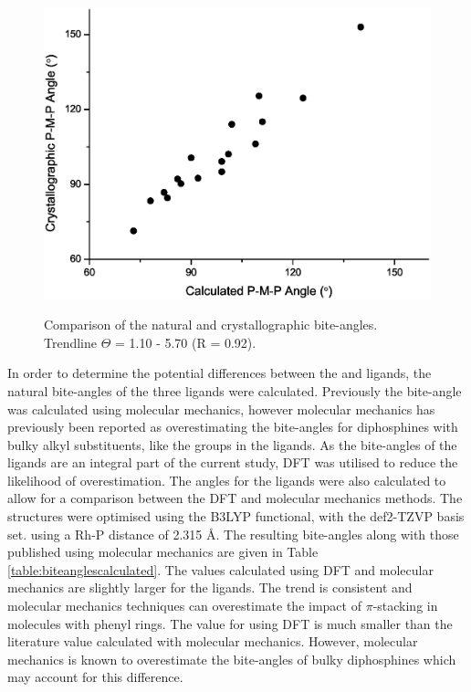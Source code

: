 \begin{figure}[htb]
\begin{center}
\vspace{0.5cm}
\includegraphics[width=\textwidth]{../Figures/Biteanglegraphorigin.eps}
\caption[Comparison of the natural and crystallographic bite-angles]{Comparison of the natural and crystallographic bite-angles.  Trendline $\Theta$ = 1.10 \natbiteangle - 5.70 (R = 0.92).}
\vspace{0.2cm}
\label{Biteanglegraph}
\end{center}
\end{figure}
\vspace{0.2cm}

In order to determine the potential differences between the \tBuxantphos{} and \Phxantphos{} ligands, the natural bite-angles of the three \tBuxantphos{} ligands were calculated.  Previously the \tBuxantphos{} bite-angle was calculated using molecular mechanics, however molecular mechanics has previously been reported as overestimating the bite-angles for diphosphines with bulky alkyl substituents, like the \tBu{} groups in the \tBuxantphos{} ligands.\cite{Dierkes1999}  As the bite-angles of the \tBuxantphos{} ligands are an integral part of the current study, \gls{DFT} was utilised to reduce the likelihood of overestimation.  The angles for the \Phxantphos{} ligands were also calculated to allow for a comparison between the \gls{DFT} and molecular mechanics methods.  The structures were optimised using the B3LYP functional,\cite{Becke1993, Lee1988, Vosko1980, Stephens1994} with the def2-TZVP basis set.\cite{Andrae1990, Weigend2005} using a Rh-P distance of 2.315 \si{\angstrom}.  The resulting bite-angles along with those published using molecular mechanics are given in Table \ref{table:biteanglescalculated}.  The values calculated using DFT and molecular mechanics are slightly larger for the \Phxantphos{} ligands.  The trend is consistent and molecular mechanics techniques can overestimate the impact of $\pi$-stacking in molecules with phenyl rings.  The value for \tBuxantphos{} using DFT is much smaller than the literature value calculated with molecular mechanics.  However, molecular mechanics is known to overestimate the bite-angles of bulky diphosphines which may account for this difference.\cite{Dierkes1999}

